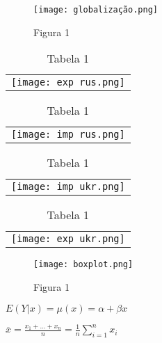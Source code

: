 \begin{center}
    \begin{figure}[h]
        \texttt{[image: globalização.png]}
        \caption{Figura 1}
        \label{globalizacao}
    \end{figure}
\end{center}

\begin{table}[h]
    \begin{center}
        \begin{tabular}{c}
            \texttt{[image: exp rus.png]}
        \end{tabular}
        \label{exprus}
        \caption{Tabela 1}
    \end{center}
\end{table}

\begin{table}[h]
    \begin{center}
        \begin{tabular}{c}
            \texttt{[image: imp rus.png]}
        \end{tabular}
        \label{exprus}
        \caption{Tabela 1}
    \end{center}
\end{table}

\begin{table}[h]
    \begin{center}
        \begin{tabular}{c}
            \texttt{[image: imp ukr.png]}
        \end{tabular}
        \label{exprus}
        \caption{Tabela 1}
    \end{center}
\end{table}

\begin{table}[h]
    \begin{center}
        \begin{tabular}{c}
            \texttt{[image: exp ukr.png]}
        \end{tabular}
        \label{exprus}
        \caption{Tabela 1}
    \end{center}
\end{table}

\begin{figure}[h]
    \begin{center}
        \texttt{[image: boxplot.png]}
        \caption{Figura 1}
        \label{globalizacao}
    \end{center}
\end{figure}

$E(Y|x) = \mu (x) = \alpha + \beta x$

$\overline{x} = \frac{x_1 + ... + x_n}{n} = \frac{1}{n}\sum_{i = 1}^{n}  x_i$